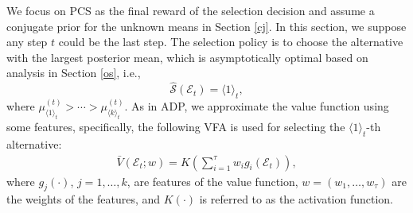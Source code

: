 \documentclass[journal]{IEEEtran}
\begin{document}
 We focus on PCS as the final reward of the selection decision and assume a conjugate prior for the unknown means in Section \ref{cj}. In this section, we suppose any step $t$ could be the last step.
  The selection policy is to choose the alternative with the largest posterior mean, which is asymptotically optimal based on analysis in Section \ref{os}, i.e.,
 $$\widehat{\mathcal{S}}(\mathcal{E}_t)=\langle 1 \rangle_t,$$
 where $\mu_{\langle 1 \rangle_t}^{(t)}>\cdots>\mu_{\langle k\rangle_t}^{(t)}$.
 As in ADP, we approximate the value function using some features, specifically, the following VFA is used for selecting the $\langle 1 \rangle_t$-th alternative:
 \begin{align}\label{nn}\bar{V}(\mathcal{E}_t;w)=K\left(\sum_{i=1}^{\tau} w_i g_i(\mathcal{E}_t)\right),\end{align}
 where $g_j(\cdot)$, $j=1,\ldots,k$, are features of the value function, $w=(w_1,\ldots,w_{\tau})$ are the weights of the features, and $K(\cdot)$ is referred to as the activation function. 
 
\end{document}
